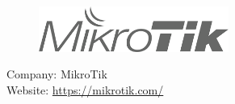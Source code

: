 \begin{figure}[h!]
\includegraphics[height=1.5cm]{Pictures/AppMikroTikLogo}
\end{figure}
\vspace{3mm}
Company: MikroTik\\
Website: \url{https://mikrotik.com/}
